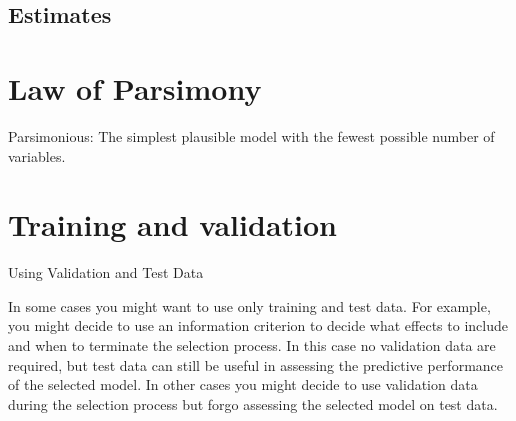 \documentclass[a4paper,12pt]{article}
\begin{document}
\subsection{Estimates}


\newpage




\section{Law of Parsimony}
Parsimonious: The simplest plausible model with the fewest possible number of variables.





\section{Training and validation}
Using Validation and Test Data


In some cases you might want to use only training and test data. For example, you might decide to use an information criterion to decide what effects to include and when to terminate the selection process. In this case no validation data are required, but test data can still be useful in assessing the predictive performance of the selected model. In other cases you might decide to use validation data during the selection process but forgo assessing the selected model on test data. 
\end{document}

